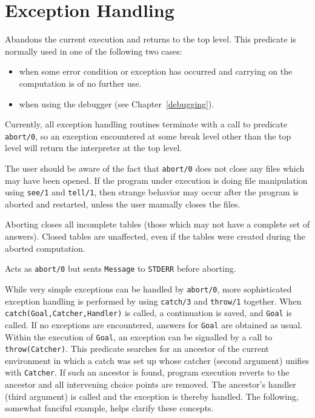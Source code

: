 


\section{Exception Handling}\label{exception}

\begin{description}

    Abandons the current execution and returns to the top level.  This
    predicate is normally used in one of the following two cases: 
    \begin{itemize} 
    \item when some error condition or exception has occurred and carrying
	  on the computation is of no further use.
    \item when using the debugger (see Chapter~\ref{debugging}).  
    \end{itemize}
    Currently, all exception handling routines terminate with a call to 
    predicate {\tt abort/0}, so an exception encountered at some break level 
    other than the top level will return the interpreter at the top level.

    The user should be aware of the fact that {\tt abort/0} does not close 
    any files which may have been opened.  If the program under execution is 
    doing file manipulation using {\tt see/1} and {\tt tell/1}, then strange 
    behavior may occur after the program is aborted and restarted, unless
    the user manually closes the files.

    Aborting closes all incomplete tables (those which may not have a 
    complete set of answers).  Closed tables are unaffected, even if 
    the tables were created during the aborted computation.

 
    Acts as {\tt abort/0} but sents {\tt Message} to {\tt STDERR}
    before aborting.

\vspace{-7mm}
While very simple exceptions can be handled by {\tt abort/0}, more
sophisticated exception handling is performed by using {\tt catch/3}
and {\tt throw/1} together.  When {\tt catch(Goal,Catcher,Handler)} is
called, a continuation is saved, and {\tt Goal} is called.  If no
exceptions are encountered, answers for {\tt Goal} are obtained as
usual.  Within the execution of {\tt Goal}, an exception can be
signalled by a call to {\tt throw(Catcher)}.  This predicate searches
for an ancestor of the current environment in which a catch was set up
whose catcher (second argument) unifies with {\tt Catcher}.  If such
an ancestor is found, program execution reverts to the ancestor and
all intervening choice points are removed.  The ancestor's handler
(third argument) is called and the exception is thereby handled.  The
following, somewhat fanciful example, helps clarify these concepts.


\end{description}
